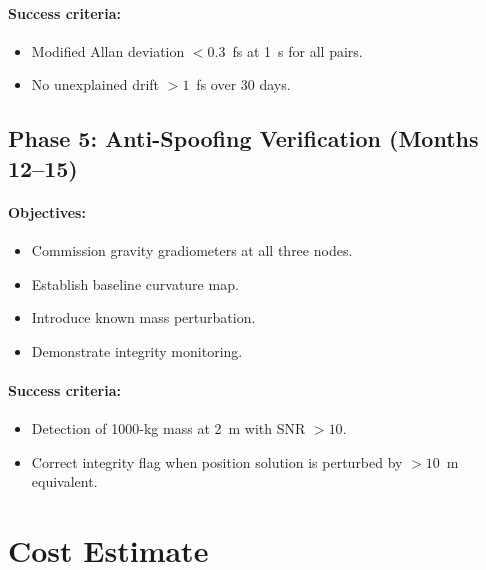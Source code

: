 \documentclass[12pt,letterpaper]{article}
\begin{document}
\paragraph{Success criteria:}
\begin{itemize}
\item Modified Allan deviation $< 0.3$~fs at 1~s for all pairs.
\item No unexplained drift $> 1$~fs over 30 days.
\end{itemize}

\subsection{Phase 5: Anti-Spoofing Verification (Months 12--15)}

\paragraph{Objectives:}
\begin{itemize}
\item Commission gravity gradiometers at all three nodes.
\item Establish baseline curvature map.
\item Introduce known mass perturbation.
\item Demonstrate integrity monitoring.
\end{itemize}

\paragraph{Success criteria:}
\begin{itemize}
\item Detection of 1000-kg mass at 2~m with SNR $> 10$.
\item Correct integrity flag when position solution is perturbed by $> 10$~m equivalent.
\end{itemize}

\section{Cost Estimate}
\end{document}
